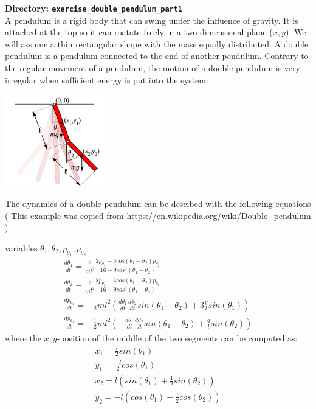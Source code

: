 {\bf Directory: {\tt exercise\_double\_pendulum\_part1}}\\

A pendulum is a rigid body that can swing under the influence of gravity. It is attached at the top so it can roatate freely in a two-dimensional plane ($x,y$).
We will assume a thin rectangular shape with the mass equally distributed. A double pendulum is a pendulum connected to the end of another pendulum. Contrary to the 
regular movement of a pendulum, the motion of a double-pendulum is very irregular when sufficient energy is put into the system. 

\includegraphics[height=4cm]{Double-compound-pendulum.png}

The dynamics of a double-pendulum can be descibed with the following equations 
( This example was copied from https://en.wikipedia.org/wiki/Double\_pendulum )

variables $\theta_1, \theta_2, p_{\theta_1}, p_{\theta_2}$:
\begin{eqnarray}
   \frac{d \theta_1}{dt}= \frac{6}{m l^2} \frac{2 p_{\theta_1} - 3cos(\theta_1-\theta_2) p_{\theta_2}}
   {16-9 cos^2(\theta_1-\theta_2)}\\
   \frac{d \theta_2}{dt}= \frac{6}{m l^2} \frac{8 p_{\theta_2} - 3cos(\theta_1-\theta_2) p_{\theta_1}}
   {16-9 cos^2(\theta_1-\theta_2)}\\
   \frac{dp_{\theta_1}}{dt} = -\frac{1}{2} ml^2 \left( \frac{d \theta_1}{dt} \frac{d \theta_2}{dt} sin(\theta_1-\theta_2) + 3\frac{g}{l} sin(\theta_1) \right)  \\
   \frac{dp_{\theta_1}}{dt} = -\frac{1}{2} ml^2 \left( -\frac{d \theta_1}{dt} \frac{d \theta_2}{dt} sin(\theta_1-\theta_2) + \frac{g}{l} sin(\theta_2) \right) 
\end{eqnarray}
where the $x,y$-position of the middle of the two segments can be computed as:
\begin{eqnarray}
   x_1 = \frac{l}{2} sin(\theta_1) \\
   y_1 = \frac{-l}{2} cos(\theta_1) \\
   x_2 = l ( sin(\theta_1) + \frac{1}{2} sin(\theta_2) ) \\
   y_2 = -l ( cos(\theta_1) + \frac{1}{2} cos(\theta_2) )
\end{eqnarray}


